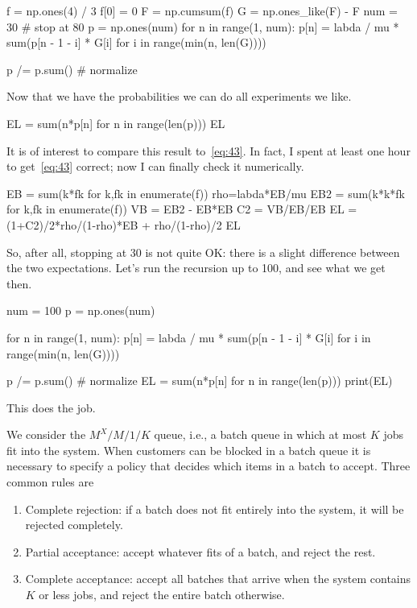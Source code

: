 \begin{exercise}
\begin{solution}
\begin{pyconsole}
f = np.ones(4) / 3
f[0] = 0
F = np.cumsum(f)
G = np.ones_like(F) - F
num = 30 # stop at 80
p = np.ones(num)
for n in range(1, num):
 p[n] = labda / mu * sum(p[n - 1 - i] * G[i] for i in range(min(n, len(G))))

p /= p.sum() # normalize
\end{pyconsole}

Now that we have the probabilities we can do all experiments we like. 
\begin{pyconsole}
EL = sum(n*p[n] for n in range(len(p)))
EL 
\end{pyconsole}

It is of interest to compare this result to~\cref{eq:43}.
In fact, I spent at least one hour to get~\cref{eq:43} correct; now I can finally check it numerically.


\begin{pyconsole}
EB = sum(k*fk for k,fk in enumerate(f))
rho=labda*EB/mu
EB2 = sum(k*k*fk for k,fk in enumerate(f))
VB = EB2 - EB*EB
C2 = VB/EB/EB
EL = (1+C2)/2*rho/(1-rho)*EB + rho/(1-rho)/2
EL
\end{pyconsole}

So, after all, stopping at 30 is not quite OK: there is a slight difference between the two expectations.
Let's run the recursion up to 100, and see what we get then.

\begin{pyconsole}
num = 100
p = np.ones(num)

for n in range(1, num):
 p[n] = labda / mu * sum(p[n - 1 - i] * G[i] for i in range(min(n, len(G))))

p /= p.sum() # normalize
EL = sum(n*p[n] for n in range(len(p)))
print(EL)
\end{pyconsole}
This does the job.
\end{solution}
\end{exercise}


We consider the $M^X/M/1/K$ queue, i.e., a batch queue in which at most $K$ jobs fit into the system.
When customers can be blocked in a batch queue it is necessary to specify a policy that decides which items in a batch to accept.
Three common rules are
\begin{enumerate}
\item Complete rejection: if a batch does not fit entirely into the system, it will be rejected completely.
\item Partial acceptance: accept whatever fits of a batch, and reject the rest.
\item Complete acceptance: accept all batches that arrive when the system contains $K$ or less jobs, and reject the entire batch otherwise.
\end{enumerate}

